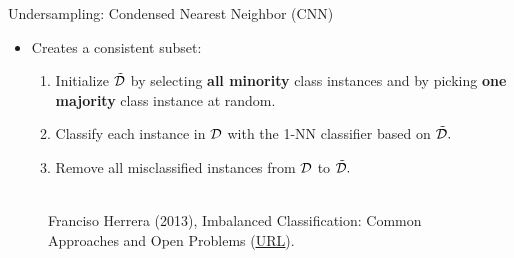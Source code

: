 \documentclass[11pt,compress,t,notes=noshow, xcolor=table]{beamer}
\begin{document}
    \begin{frame}{Undersampling: Condensed Nearest Neighbor (CNN)}
    \footnotesize{
        \begin{itemize}
            \item Creates a consistent subset:
            
            \begin{enumerate} \footnotesize
    
                \item Initialize $\tilde{\mathcal{D}}$ by selecting \textbf{all minority} class instances and by picking \textbf{one majority} class instance at random.
                \vspace{5pt}
        
                \item Classify each instance in $\mathcal{D}$ with the 1-NN classifier based on $\tilde{\mathcal{D}}.$
                \vspace{5pt}
            
                \item Remove all misclassified instances from $\mathcal{D}$ to $\tilde{\mathcal{D}}.$
                
            \end{enumerate}	

        \end{itemize}

        \begin{figure}
            \centering
            			\tiny
            \\ Franciso Herrera (2013), Imbalanced Classification: Common
            Approaches and Open Problems (\href{https://sci2s.ugr.es/sites/default/files/files/TutorialsAndPlenaryTalks/SSTiC-Trends in-Classification-Imbalanced-data-sets.pdf}{\underline{URL}}).
        \end{figure}
        
    }
        
        
    \end{frame}
	
\end{document}
